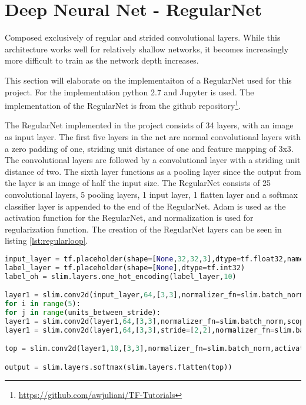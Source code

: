 \section{Deep Neural Net - RegularNet}
Composed exclusively of regular and strided convolutional layers. While this architecture works well for relatively shallow networks, it becomes increasingly more difficult to train as the network depth increases.

This section will elaborate on the implementaiton of a RegularNet used for this project. For the implementation python 2.7 and Jupyter is used. The implementation of the RegularNet is from the github repository\footnote{\url{https://github.com/awjuliani/TF-Tutorials}}. 

The RegularNet implemented in the project consists of 34 layers, with an image as input layer. The first five layers in the net are normal convolutional layers with a zero padding of one, striding unit distance of one and feature mapping of 3x3. The convolutional layers are followed by a convolutional layer with a striding unit distance of two. The sixth layer functions as a pooling layer since the output from the layer is an image of half the input size. The RegularNet consists of 25 convolutional layers, 5 pooling layers, 1 input layer, 1 flatten layer and a softmax classifier layer is appended to the end of the RegularNet. Adam is used as the activation function for the RegularNet, and normalization is used for regularization function. The creation of the RegularNet layers can be seen in listing \ref{lst:regularloop}.

\begin{lstlisting}[language=Python, label=lst:regularloop, caption=For loop that creates the layers in the RegularNet]
input_layer = tf.placeholder(shape=[None,32,32,3],dtype=tf.float32,name='input')
label_layer = tf.placeholder(shape=[None],dtype=tf.int32)
label_oh = slim.layers.one_hot_encoding(label_layer,10)

layer1 = slim.conv2d(input_layer,64,[3,3],normalizer_fn=slim.batch_norm,scope='conv_'+str(0))
for i in range(5):
for j in range(units_between_stride):
layer1 = slim.conv2d(layer1,64,[3,3],normalizer_fn=slim.batch_norm,scope='conv_'+str((j+1) + (i*units_between_stride)))
layer1 = slim.conv2d(layer1,64,[3,3],stride=[2,2],normalizer_fn=slim.batch_norm,scope='conv_s_'+str(i))

top = slim.conv2d(layer1,10,[3,3],normalizer_fn=slim.batch_norm,activation_fn=None,scope='conv_top')

output = slim.layers.softmax(slim.layers.flatten(top))
\end{lstlisting}

